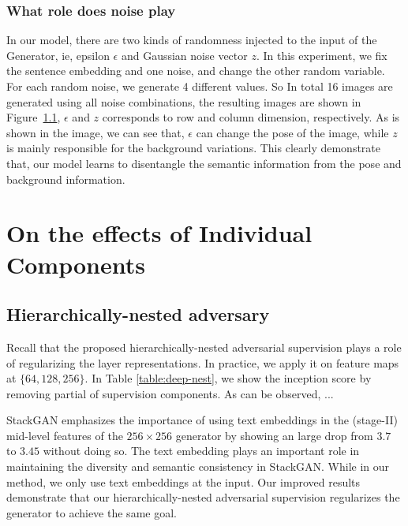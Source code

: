 \documentclass[10pt,twocolumn,letterpaper]{article}
\begin{document}
\subsubsection{What role does noise play}
In our model, there are two kinds of randomness injected to the input of the Generator, ie, epsilon $\epsilon$ and Gaussian noise vector $z$.
In this experiment, we fix the sentence embedding and one noise, and change the other random variable. For each random noise, we generate 4 different values. So In total 16 images are generated using all noise combinations, the resulting images are shown in Figure~\ref{}, $\epsilon$ and $z$ corresponds to row and column dimension, respectively. As is shown in the image, we can see that, $\epsilon$ can change the pose of the image, while $z$ is mainly responsible for the background variations. This clearly demonstrate that, our model learns to disentangle the semantic information from the pose and background information.

\section{On the effects of Individual Components}
\subsection{Hierarchically-nested adversary}
Recall that the proposed hierarchically-nested adversarial supervision plays a role of regularizing the layer representations. In practice, we apply it on feature maps at $\{64, 128, 256\}$. In Table \ref{table:deep-nest}, we show the inception score by removing partial of supervision components. As can be observed, ...

StackGAN emphasizes the importance of using text embeddings in the (stage-II) mid-level features of the $256{\times}256$ generator by showing an large drop from $3.7$ to $3.45$ without doing so. The text embedding plays an important role in maintaining the diversity and semantic consistency in StackGAN. While in our method, we only use text embeddings at the input. Our improved results demonstrate that our hierarchically-nested adversarial supervision regularizes the generator to achieve the same goal. 
\end{document}
